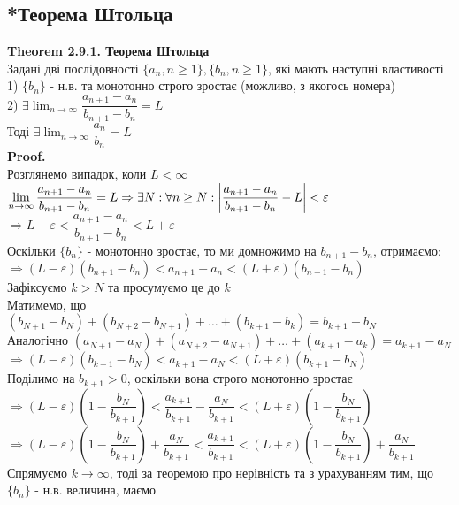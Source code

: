 \documentclass[a4paper, 14pt]{extarticle}
\def\huge{\displaystyle}
\def\th#1{\textbf{Theorem {#1}}}
\def\proof{\textbf{Proof.}\\}
\begin{document}
	\subsection{*Теорема Штольца}
	\th{2.9.1. Теорема Штольца}\\
	Задані дві послідовності $\{a_n, n \geq 1\}, \{b_n, n \geq 1\}$, які мають наступні властивості\\
	1) $\{b_n\}$ - н.в. та монотонно строго зростає (можливо, з якогось номера)\\
	2) $\exists \huge \lim_{n \to \infty} \dfrac{a_{n+1} - a_n}{b_{n+1} - b_n} = L$\\
	Тоді $\exists \huge \lim_{n \to \infty} \dfrac{a_n}{b_n} = L$\\
	\proof
	Розглянемо випадок, коли $L < \infty$\\
	$\huge \lim_{n \to \infty} \dfrac{a_{n+1} - a_n}{b_{n+1} - b_n} = L \Rightarrow \exists N: \forall n \geq N: \abs{\dfrac{a_{n+1}-a_n}{b_{n+1}-b_n} - L} < \varepsilon$\\
	$\Rightarrow L - \varepsilon < \dfrac{a_{n+1} - a_n}{b_{n+1} - b_n} < L + \varepsilon$\\
	Оскільки $\{b_n\}$ - монотонно зростає, то ми домножимо на $b_{n+1} - b_n$, отримаємо:\\
	$\Rightarrow (L - \varepsilon)(b_{n+1} - b_n) < a_{n+1} - a_n < (L + \varepsilon)(b_{n+1} - b_n)$\\
	Зафіксуємо $k > N$ та просумуємо це до $k$\\
	Матимемо, що $(b_{N+1} - b_N) + (b_{N+2} - b_{N+1}) + \dots + (b_{k+1} - b_{k}) = b_{k+1} - b_N$\\
	Аналогічно $(a_{N+1} - a_N) + (a_{N+2} - a_{N+1}) + \dots + (a_{k+1} - a_{k}) = a_{k+1} - a_N$\\
	$\Rightarrow(L - \varepsilon)(b_{k+1} - b_N) < a_{k+1} - a_N < (L + \varepsilon)(b_{k+1} - b_N)$\\
	Поділимо на $b_{k+1} > 0$, оскільки вона строго монотонно зростає\\
	$\Rightarrow (L - \varepsilon) \left(1 - \dfrac{b_N}{b_{k+1}} \right) < \dfrac{a_{k+1}}{b_{k+1}} - \dfrac{a_N}{b_{k+1}} < (L + \varepsilon) \left(1 - \dfrac{b_N}{b_{k+1}} \right)$\\
	$\Rightarrow (L - \varepsilon) \left(1 - \dfrac{b_N}{b_{k+1}} \right) + \dfrac{a_N}{b_{k+1}}  < \dfrac{a_{k+1}}{b_{k+1}} < (L + \varepsilon) \left(1 - \dfrac{b_N}{b_{k+1}} \right) + \dfrac{a_N}{b_{k+1}}$\\
	Спрямуємо $k \to \infty$, тоді за теоремою про нерівність та з урахуванням тим, що $\{b_n\}$ - н.в. величина, маємо\\
\end{document}
